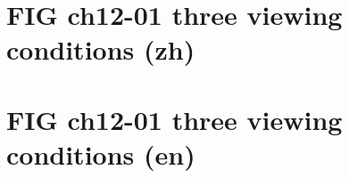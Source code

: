 \documentclass[UTF8,fontset=fandol,10pt]{ctexart}
\begin{document}
\section*{FIG ch12-01 three viewing conditions (zh)}

\newpage
\section*{FIG ch12-01 three viewing conditions (en)}

\end{document}
